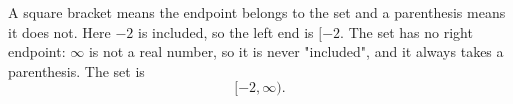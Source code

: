 A square bracket means the endpoint belongs to the set and a parenthesis means it does not. Here $-2$ is included, so the left end is $[-2$. The set has no right endpoint: $\infty$ is not a real number, so it is never "included", and it always takes a parenthesis. The set is
\[
\boxed{[-2,\infty)} .
\]
